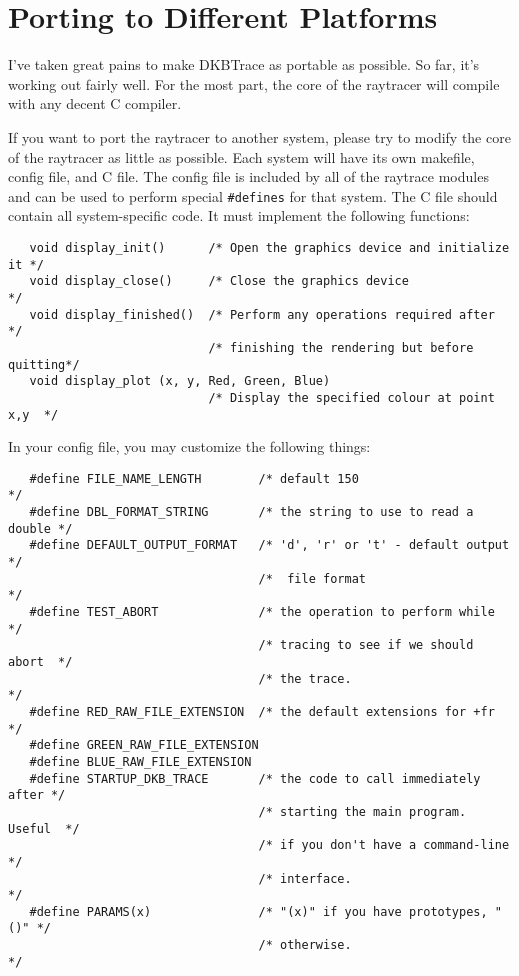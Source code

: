 \chapter{Porting to Different Platforms}

I've taken great pains to make DKBTrace as portable as possible.  So
far, it's working out fairly well.  For the most part, the core of the
raytracer will compile with any decent C compiler.

If you want to port the raytracer to another system, please try to
modify the core of the raytracer as little as possible.  Each system
will have its own makefile, config file, and C file.  The config file
is included by all of the raytrace modules and can be used to perform
special {\tt \#defines} for that system.  The C file should contain all
system-specific code.  It must implement the following functions:

{\footnotesize
\begin{verbatim}
   void display_init()      /* Open the graphics device and initialize it */
   void display_close()     /* Close the graphics device                  */
   void display_finished()  /* Perform any operations required after      */
                            /* finishing the rendering but before quitting*/
   void display_plot (x, y, Red, Green, Blue)
                            /* Display the specified colour at point x,y  */
\end{verbatim}
}

\noindent
In your config file, you may customize the following things:

{\footnotesize
\begin{verbatim}
   #define FILE_NAME_LENGTH        /* default 150                        */
   #define DBL_FORMAT_STRING       /* the string to use to read a double */
   #define DEFAULT_OUTPUT_FORMAT   /* 'd', 'r' or 't' - default output   */
                                   /*  file format                       */
   #define TEST_ABORT              /* the operation to perform while     */
                                   /* tracing to see if we should abort  */
                                   /* the trace.                         */
   #define RED_RAW_FILE_EXTENSION  /* the default extensions for +fr     */
   #define GREEN_RAW_FILE_EXTENSION
   #define BLUE_RAW_FILE_EXTENSION
   #define STARTUP_DKB_TRACE       /* the code to call immediately after */
                                   /* starting the main program. Useful  */
                                   /* if you don't have a command-line   */
                                   /* interface.                         */
   #define PARAMS(x)               /* "(x)" if you have prototypes, "()" */
                                   /* otherwise.                         */
\end{verbatim}
}
